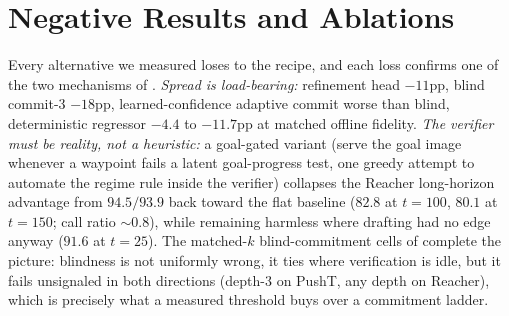 \documentclass{article}
\begin{document}
\section{Negative Results and Ablations}
\label{sec:negatives}
Every alternative we measured loses to the recipe, and each loss confirms one of the
two mechanisms of . \emph{Spread is load-bearing:} refinement head
$-11$pp, blind commit-3 $-18$pp, learned-confidence adaptive commit worse than blind,
deterministic regressor $-4.4$ to $-11.7$pp at matched offline fidelity. \emph{The
verifier must be reality, not a heuristic:} a goal-gated variant (serve the goal
image whenever a waypoint fails a latent goal-progress test, one greedy attempt to
automate the regime rule inside the verifier) collapses the Reacher long-horizon
advantage from $94.5/93.9$ back toward the flat baseline ($82.8$ at $t{=}100$, $80.1$
at $t{=}150$; call ratio ${\sim}0.8$), while remaining harmless where drafting had no
edge anyway ($91.6$ at $t{=}25$). The matched-$k$ blind-commitment cells of
 complete the picture: blindness is not uniformly wrong, it ties where verification is idle, but it fails unsignaled in both directions
(depth-3 on PushT, any depth on Reacher), which is precisely what a measured
threshold buys over a commitment ladder.
\end{document}
